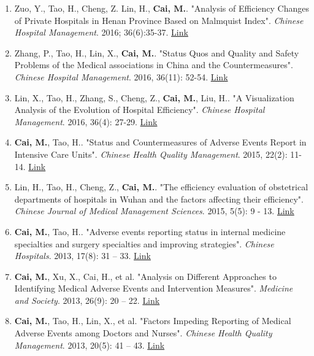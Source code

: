 \documentclass[11pt, a4paper]{article}
\newcommand{\years}[1]{\marginnote{\scriptsize #1}}
\begin{document}
\begin{enumerate}[leftmargin=0ex,itemsep=1ex]
		\item Zuo, Y., Tao, H., Cheng, Z. Lin, H., \textbf{Cai, M.}. "Analysis of Efficiency Changes of Private Hospitals in Henan Province Based on Malmquist Index". \emph{Chinese Hospital Management}. 2016; 36(6):35-37. \href{http://www.cnki.com.cn/Article/CJFDTOTAL-YYGL201606020.htm}{Link}
		
		\item Zhang, P., Tao, H., Lin, X., \textbf{Cai, M.}. "Status Quos and Quality and Safety Problems of the Medical associations in China and the Countermeasures". \emph{Chinese Hospital Management}. 2016, 36(11): 52-54. \href{http://www.cnki.com.cn/Article/CJFDTOTAL-YYGL201611027.htm}{Link}
		
		\item Lin, X., Tao, H., Zhang, S., Cheng, Z., \textbf{Cai, M.}, Liu, H.. "A Visualization Analysis of the Evolution of Hospital Efficiency". \emph{Chinese Hospital Management}. 2016, 36(4): 27-29. \href{http://www.cnki.com.cn/Article/CJFDTOTAL-YYGL201604015.htm}{Link}
		
		\item \years{2016}\textbf{Cai, M.}, Tao, H.. "Status and Countermeasures of Adverse Events Report in Intensive Care Units". \emph{Chinese Health Quality Management}. 2015, 22(2): 11-14. \href{http://www.cnki.com.cn/Article/CJFDTOTAL-WSJG201502008.htm}{Link}
		
		\item \years{2015}Lin, H., Tao, H., Cheng, Z., \textbf{Cai, M.}. "The efficiency evaluation of obstetrical departments of hospitals in Wuhan and the factors affecting their efficiency". \emph{Chinese Journal of Medical Management Sciences}. 2015, 5(5): 9 - 13. \href{http://www.cnki.com.cn/Article/CJFDTOTAL-YLGL201505004.htm}{Link}
		
		\item \years{2013}\textbf{Cai, M.}, Tao, H.. "Adverse events reporting status in internal medicine specialties and surgery specialties and improving strategies". \emph{Chinese Hospitals}. 2013, 17(8): 31 – 33. \href{http://www.cnki.com.cn/Article/CJFDTOTAL-ZGYU201308016.htm}{Link}
		
		\item \textbf{Cai, M.}, Xu, X., Cai, H., et al. "Analysis on Different Approaches to Identifying Medical Adverse Events and Intervention Measures". \emph{Medicine and Society}. 2013, 26(9): 20 – 22. \href{http://www.cnki.com.cn/Article/CJFDTOTAL-YXSH201309007.htm}{Link}
		
		\item \textbf{Cai, M.}, Tao, H., Lin, X., et al. "Factors Impeding Reporting of Medical Adverse Events among Doctors and Nurses". \emph{Chinese Health Quality Management}. 2013, 20(5): 41 – 43. \href{http://www.cqvip.com/qk/98273x/201305/47221843.html}{Link}
	\end{enumerate}
\end{document}
